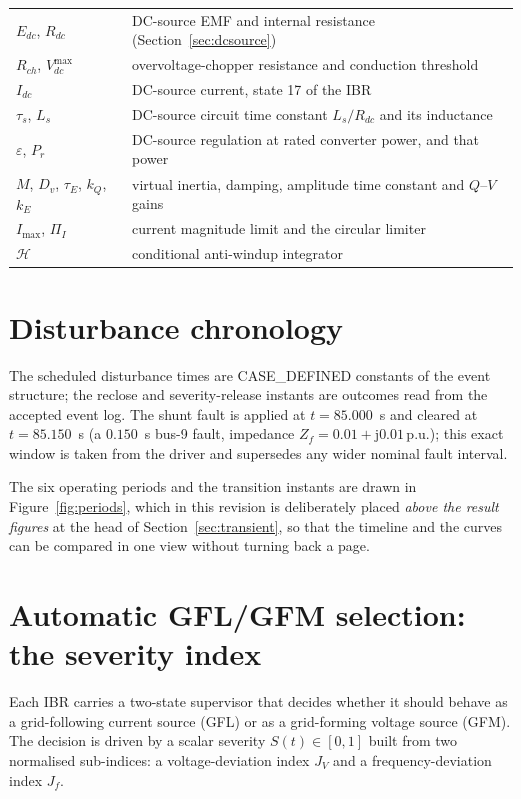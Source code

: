 \documentclass[12pt,a4paper]{article}
\theoremstyle{remark}
\newcommand{\pu}{\,\mathrm{p.u.}}
\begin{document}
\begin{longtable}{@{}l p{}@{}}
$E_{dc}$, $R_{dc}$ & DC-source EMF and internal resistance (Section~\ref{sec:dcsource}) \\
$R_{ch}$, $V_{dc}^{\max}$ & overvoltage-chopper resistance and conduction threshold \\
$I_{dc}$ & DC-source current, state 17 of the IBR \\
$\tau_s$, $L_s$ & DC-source circuit time constant $L_s/R_{dc}$ and its inductance \\
$\varepsilon$, $P_r$ & DC-source regulation at rated converter power, and that power \\
$M$, $D_v$, $\tau_E$, $k_Q$, $k_E$ & virtual inertia, damping, amplitude time constant and $Q$--$V$ gains \\
$I_{\max}$, $\Pi_I$ & current magnitude limit and the circular limiter \\
$\mathcal{H}$ & conditional anti-windup integrator \\
\bottomrule
\end{longtable}

\section{Disturbance chronology}\label{sec:chrono}
The scheduled disturbance times are \textsf{CASE\_DEFINED} constants of the
event structure; the reclose and severity-release instants are outcomes read
from the accepted event log. The shunt fault is applied at $t=85.000$~s
and cleared at $t=85.150$~s (a $0.150$~s bus-9 fault, impedance
$Z_f=0.01+\mathrm{j}0.01\pu$); this exact window is taken from the driver and
supersedes any wider nominal fault interval.

The six operating periods and the transition instants are drawn in
Figure~\ref{fig:periods}, which in this revision is deliberately placed
\emph{above the result figures} at the head of Section~\ref{sec:transient}, so
that the timeline and the curves can be compared in one view without turning
back a page.

\section{Automatic GFL/GFM selection: the severity index}\label{sec:sev}
Each IBR carries a two-state supervisor that decides whether it should behave as
a grid-following current source (GFL) or as a grid-forming voltage source (GFM).
The decision is driven by a scalar severity $S(t)\in[0,1]$ built from two
normalised sub-indices: a voltage-deviation index $J_V$ and a
frequency-deviation index $J_f$.
\end{document}
